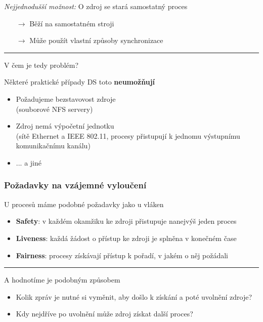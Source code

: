 \documentclass[usenames,dvipsnames,9pt]{beamer}
\begin{document}
\begin{frame}

\textit{Nejjednodušší možnost:} \large O zdroj se stará samostatný proces

\begin{itemize}
\item[$\rightarrow$] Běží na samostatném stroji
\item[$\rightarrow$] Může použít vlastní způsoby synchronizace
\end{itemize}

  \pause\vspace{1em}\hrule\vspace{1em}

  \begin{center}
    \LARGE V čem je tedy problém?
  \end{center}

\vspace{1em}\pause

Některé praktické případy DS toto {\bf neumožňují}


  \begin{itemize}
    \item Požadujeme bezstavovost zdroje \\
          {\small (souborové NFS servery)}
    \item Zdroj nemá výpočetní jednotku \\
          {\small (sítě Ethernet a IEEE 802.11, procesy přistupují k jednomu výstupnímu komunikačnímu kanálu)}
    \item ... a jiné
  \end{itemize}


\end{frame}

\begin{frame}

\frametitle{Požadavky na vzájemné vyloučení}

U procesů máme podobné požadavky jako u vláken

  \begin{itemize}
    \pause\item {\bf Safety}: v každém okamžiku ke zdroji přistupuje nanejvýš jeden proces
    \pause\item {\bf Liveness}: každá žádost o přístup ke zdroji je splněna v konečném čase
    \pause\item {\bf \textcolor{BrickRed}{Fairness}}: procesy získávají přístup k pořadí, v jakém o něj požádali
  \end{itemize}

    \vspace{1em}\hrule\vspace{1em}

    A hodnotíme je podobným způsobem

      \begin{itemize}
    \pause\item Kolik zpráv je nutné si vyměnit, aby došlo k získání a poté uvolnění zdroje?
    \pause\item Kdy nejdříve po uvolnění může zdroj získat další proces?
  \end{itemize}


\end{frame}
\end{document}
